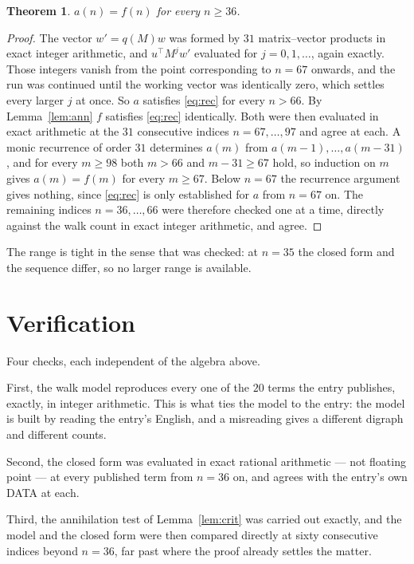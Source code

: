 \documentclass[11pt,a4paper]{article}
\theoremstyle{plain}
\newtheorem{theorem}{Theorem}
\theoremstyle{definition}
\begin{document}
\begin{theorem}
$a(n)=f(n)$ for every $n\ge36$.
\end{theorem}

\begin{proof}
The vector $w'=q(M)w$ was formed by $31$ matrix--vector products in exact integer
arithmetic, and $u^{\!\top}M^{j}w'$ evaluated for $j=0,1,\dots$, again exactly. Those integers
vanish from the point corresponding to $n=67$ onwards, and the run was continued until the
working vector was identically zero, which settles every larger $j$ at once. So $a$ satisfies
\eqref{eq:rec} for every $n>66$. By Lemma~\ref{lem:ann} $f$ satisfies \eqref{eq:rec}
identically. Both were then evaluated in exact arithmetic at the $31$ consecutive indices
$n=67,\dots,97$ and agree at each. A monic recurrence of order $31$
determines $a(m)$ from $a(m-1),\dots,a(m-31)$, and for every $m\ge98$ both
$m>66$ and $m-31\ge67$ hold, so induction on $m$ gives $a(m)=f(m)$ for every
$m\ge67$.
Below $n=67$ the recurrence argument gives nothing, since \eqref{eq:rec} is only
established for $a$ from $n=67$ on. The remaining indices $n=36,\dots,66$ were
therefore checked one at a time, directly against the walk count in exact integer arithmetic,
and agree.
\end{proof}

The range is tight in the sense that was checked: at $n=35$ the closed form and the sequence differ, so no larger range is available.

\section{Verification}

Four checks, each independent of the algebra above.

First, the walk model reproduces every one of the $20$ terms the entry publishes,
exactly, in integer arithmetic. This is what ties the model to the entry: the model is built
by reading the entry's English, and a misreading gives a different digraph and different
counts.

Second, the closed form was evaluated in exact rational arithmetic --- not floating point ---
at every published term from $n=36$ on, and agrees with the entry's own DATA at each.

Third, the annihilation test of Lemma~\ref{lem:crit} was carried out exactly, and the model
and the closed form were then compared directly at sixty consecutive indices beyond
$n=36$, far past where the proof already settles the matter.
\end{document}
